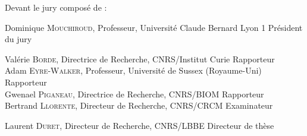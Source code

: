 \fontsize{12pt}{14pt}\selectfont
Devant le jury composé de :
\bigskip\bigskip

\fontsize{11pt}{13pt}\selectfont
%
Dominique \textsc{Mouchiroud}, Professeur, Universit\'e Claude Bernard Lyon 1 \hfill Pr\'esident du jury\bigskip %
%

Val\'erie \textsc{Borde}, Directrice de Recherche, CNRS/Institut Curie \hfill  Rapporteur\\
%
Adam \textsc{Eyre-Walker}, Professeur, Universit\'e de Sussex (Royaume-Uni) \hfill Rapporteur\\
%
Gwenael \textsc{Piganeau}, Directrice de Recherche, CNRS/BIOM \hfill Rapporteur\\
%
Bertrand \textsc{Llorente}, Directeur de Recherche, CNRS/CRCM \hfill Examinateur\bigskip

Laurent \textsc{Duret}, Directeur de Recherche, CNRS/LBBE \hfill Directeur de th\`ese\\
%

